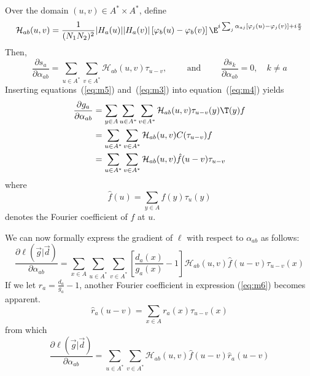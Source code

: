 Over the domain $(u,v) \in A^* \times A^*$, define %
\[
\mathcal{H}_{ab}(u,v) = \frac{1}{(N_1N_2)^2}|H_a(u)||H_a(v)|\,[\varphi_b(u)-\varphi_b(v)]
\,\E^{ i \sum_j \alpha_{aj}[\varphi_j(u)-\varphi_j(v)] + i\frac{\pi}{2}}
\]
Then,
\begin{equation}\label{eq:m3}
\frac{\partial s_a}{\partial \alpha_{ab}}  = 
\sum_{u\in A^*} \sum_{v\in A^*} \mathcal{H}_{ab}(u,v) \tau_{u-v}, \qquad
\text{ and } \qquad \frac{\partial s_k}{\partial \alpha_{ab}}  = 0, \quad k \neq a
\end{equation}
Inserting equations~(\ref{eq:m5}) and~(\ref{eq:m3}) into equation~(\ref{eq:m4}) yields
\begin{align*}
\frac{\partial g_a}{\partial \alpha_{ab}}&= \sum_{y\in A} \sum_{u\in A^*} \sum_{v\in A^*} \mathcal{H}_{ab}(u,v) \tau_{u-v}(y)\T(y)f\\
&= \sum_{u\in A^*} \sum_{v\in A^*} \mathcal{H}_{ab}(u,v) C(\tau_{u-v})f\\
&= \sum_{u\in A^*} \sum_{v\in A^*} \mathcal{H}_{ab}(u,v) \hat{f}(u-v)\tau_{u-v}
\end{align*}
where
\[
 \hat{f}(u) = \sum_{y\in A} f(y)\tau_u(y)
\]
denotes the Fourier coefficient of $f$ at $u$.

We can now formally express the gradient of $\ell$ with respect to $\alpha_{ab}$ as follows:
\begin{equation}\label{eq:m6}
\frac{\partial \ell\left(\vec{g} |\vec{d}\right)}{\partial \alpha_{ab}}  
= \sum_{x\in A}\sum_{u\in A^*}\sum_{v\in A^*} \left[ \frac{ d_a(x)}{g_a(x)} - 1\right]\mathcal{H}_{ab}(u,v) \hat{f}(u-v)\tau_{u-v}(x)
\end{equation}
If we let $r_a = \frac{d_a}{g_a} - 1$,
another Fourier coefficient in expression (\ref{eq:m6}) becomes apparent.
\[
 \hat{r}_a(u-v) = \sum_{x\in A} r_a(x)\tau_{u-v}(x)
\]
from which 
\begin{equation}\label{eq:m60}
\frac{\partial \ell\left(\vec{g} |\vec{d}\right)}{\partial \alpha_{ab}}  
= \sum_{u\in A^*}\sum_{v\in A^*} \mathcal{H}_{ab}(u,v) \hat{f}(u-v)\hat{r}_a(u-v)
\end{equation}

